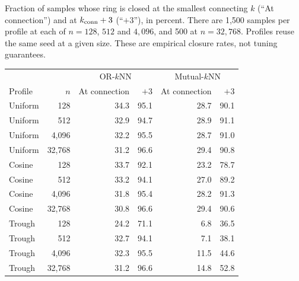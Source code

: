 \setcounter{table}{0}
\begin{center}
\begin{minipage}{\textwidth}
\centering\small
\captionsetup{type=table}
\caption{Fraction of samples whose ring is closed at the smallest
connecting $k$ (``At connection'') and at $k_{\rm conn}+3$ (``$+3$''),
in percent. There are 1,500 samples per profile at each of $n=128$,
$512$ and $4,096$, and 500 at $n=32,768$. Profiles reuse the same seed
at a given size. These are empirical closure rates, not tuning guarantees.}
\label{tab:rank-scaling}
\begin{tabular}{lr rr rr}
\toprule
& & \multicolumn{2}{c}{OR-$k$NN} & \multicolumn{2}{c}{Mutual-$k$NN} \\
\cmidrule(lr){3-4}\cmidrule(lr){5-6}
Profile & $n$ & At connection & $+3$ & At connection & $+3$ \\
\midrule
Uniform & 128 & 34.3 & 95.1 & 28.7 & 90.1 \\
Uniform & 512 & 32.9 & 94.7 & 28.9 & 91.1 \\
Uniform & 4,096 & 32.2 & 95.5 & 28.7 & 91.0 \\
Uniform & 32,768 & 31.2 & 96.6 & 29.4 & 90.8 \\
\addlinespace
Cosine & 128 & 33.7 & 92.1 & 23.2 & 78.7 \\
Cosine & 512 & 33.2 & 94.1 & 27.0 & 89.2 \\
Cosine & 4,096 & 31.8 & 95.4 & 28.2 & 91.3 \\
Cosine & 32,768 & 30.8 & 96.6 & 29.4 & 90.6 \\
\addlinespace
Trough & 128 & 24.2 & 71.1 & 6.8 & 36.5 \\
Trough & 512 & 32.7 & 94.1 & 7.1 & 38.1 \\
Trough & 4,096 & 32.3 & 95.5 & 11.5 & 44.6 \\
Trough & 32,768 & 31.2 & 96.6 & 14.8 & 52.8 \\
\bottomrule
\end{tabular}
\end{minipage}
\end{center}
